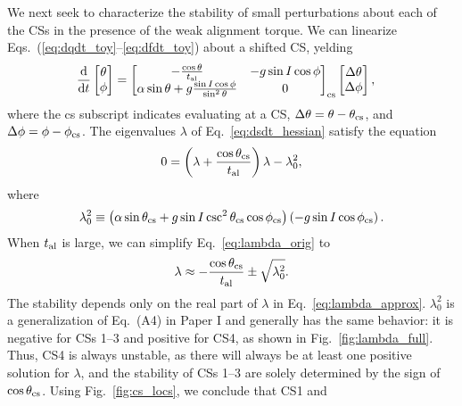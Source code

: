 \documentclass[
        fleqn,
        usenatbib,
    ]{mnras}
\newcommand*{\rd}[2]{\frac{\mathrm{d}#1}{\mathrm{d}#2}}
\newcommand*{\p}[1]{\left(#1\right)}
\begin{document}
We next seek to characterize the stability of small perturbations about each of
the CSs in the presence of the weak alignment torque. We can linearize
Eqs.~(\ref{eq:dqdt_toy}--\ref{eq:dfdt_toy}) about a shifted CS, yelding
\begin{align}
    \rd{}{t}\begin{bmatrix}
        \theta\\ \phi
    \end{bmatrix} &= \begin{bmatrix}
        -\frac{\cos \theta}{t_{\rm al}} &
        -g\sin I \cos \phi \\
        \alpha \sin \theta + g\frac{\sin I \cos \phi}{\sin^2\theta} &
        0
    \end{bmatrix}_{\rm cs}\begin{bmatrix}
        \Delta \theta \\ \Delta \phi
    \end{bmatrix},\label{eq:dsdt_hessian}
\end{align}
where the cs subscript indicates evaluating at a CS, $\Delta \theta = \theta -
\theta_{\rm cs}$, and $\Delta \phi = \phi - \phi_{\rm cs}$. The eigenvalues
$\lambda$ of Eq.~\eqref{eq:dsdt_hessian} satisfy the equation
\begin{equation}
    0 = \p{\lambda + \frac{\cos \theta_{\rm cs}}{t_{\rm al}}}\lambda
        - \lambda_0^2,\label{eq:lambda_orig}
\end{equation}
where
\begin{equation}
    \lambda_0^2 \equiv \p{\alpha
        \sin \theta_{\rm cs} + g\sin I \csc^2\theta_{\rm cs}\cos \phi_{\rm cs}}
            \p{- g \sin I \cos \phi_{\rm cs}}\label{eq:def_l0_sq}.
\end{equation}
When $t_{\rm al}$ is large, we can simplify Eq.~\eqref{eq:lambda_orig} to
\begin{equation}
    \lambda \approx -\frac{\cos \theta_{\rm cs}}{t_{\rm al}}
        \pm \sqrt{\lambda_0^2}. \label{eq:lambda_approx}
\end{equation}
The stability depends only on the real part of $\lambda$ in
Eq.~\eqref{eq:lambda_approx}. $\lambda_0^2$ is a generalization of Eq.~(A4)
in Paper I and generally has the same behavior: it is negative for CSs
1--3 and positive for CS4, as shown in Fig.~\ref{fig:lambda_full}. Thus, CS4 is
always unstable, as there will always be at least one positive solution for
$\lambda$, and the stability of CSs 1--3 are solely determined by the sign of
$\cos \theta_{\rm cs}$. Using Fig.~\ref{fig:cs_locs}, we conclude that CS1 and
\end{document}
